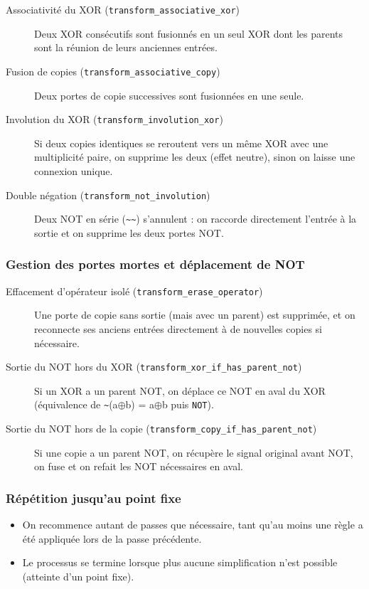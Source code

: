 \documentclass[a4paper,12pt]{article}
\begin{document}
\begin{description}
    \item[Associativité du XOR (\texttt{transform\_associative\_xor})]
    Deux XOR consécutifs sont fusionnés en un seul XOR dont les parents sont la réunion de leurs anciennes entrées.

    \item[Fusion de copies (\texttt{transform\_associative\_copy})]
    Deux portes de copie successives sont fusionnées en une seule.

    \item[Involution du XOR (\texttt{transform\_involution\_xor})]
    Si deux copies identiques se reroutent vers un même XOR avec une multiplicité paire, on supprime les deux (effet neutre), sinon on laisse une connexion unique.

    \item[Double négation (\texttt{transform\_not\_involution})]
    Deux NOT en série (\texttt{\textasciitilde\textasciitilde}) s’annulent : on raccorde directement l’entrée à la sortie et on supprime les deux portes NOT.
\end{description}

\subsubsection{Gestion des portes mortes et déplacement de NOT}

\begin{description}
    \item[Effacement d’opérateur isolé (\texttt{transform\_erase\_operator})]
    Une porte de copie sans sortie (mais avec un parent) est supprimée, et on reconnecte ses anciens entrées directement à de nouvelles copies si nécessaire.

    \item[Sortie du NOT hors du XOR (\texttt{transform\_xor\_if\_has\_parent\_not})]
    Si un XOR a un parent NOT, on déplace ce NOT en aval du XOR (équivalence de \texttt{\textasciitilde}(a$\oplus$b) = a$\oplus$b puis \texttt{NOT}).

    \item[Sortie du NOT hors de la copie (\texttt{transform\_copy\_if\_has\_parent\_not})]
    Si une copie a un parent NOT, on récupère le signal original avant NOT, on fuse et on refait les NOT nécessaires en aval.
\end{description}

\subsubsection{Répétition jusqu’au point fixe}
\begin{itemize}
    \item On recommence autant de passes que nécessaire, tant qu’au moins une règle a été appliquée lors de la passe précédente.
    \item Le processus se termine lorsque plus aucune simplification n’est possible (atteinte d’un point fixe).
\end{itemize}
\end{document}
